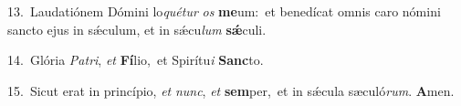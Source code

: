 {\numbfont\textcolor{\numbcolor}{13.}}~Laudatiónem Dómini lo\-\textit{qué}\-\textit{tur} \textit{os} \textbf{me}\-um:~\star et benedícat omnis caro nómini sancto ejus in sǽculum, et in sǽcu\textit{lum} \textbf{sǽ}\-culi.\par
{\numbfont\textcolor{\numbcolor}{14.}}~Glória \textit{Pa}\-\textit{tri}, \textit{et} \textbf{Fí}\-lio,~\star et Spirítu\textit{i} \textbf{Sanc}\-to.\par
{\numbfont\textcolor{\numbcolor}{15.}}~Sicut erat in princípio, \textit{et} \textit{nunc}\-, \textit{et} \textbf{sem}\-per,~\star et in sǽcula sæculó\-\textit{rum}\-. \textbf{A}\-men.\par
